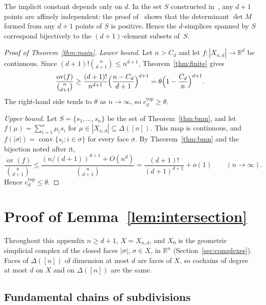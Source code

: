 \documentclass[11pt]{article}
\theoremstyle{definition}
\numberwithin{equation}{section}
\newcommand{\R}{\mathbb R}
\DeclareMathOperator{\ov}{ov}
\DeclareMathOperator{\conv}{conv}
\begin{document}
The implicit constant depends only on $d$. In the set $S$ constructed in~\cite[\S2]{BMN}, any $d+1$ points are affinely independent: the proof of~\cite[Lemma~2.2]{BMN} shows that the determinant $\det M$ formed from any $d+1$ points of $S$ is positive. Hence the $d$-simplices spanned by $S$ correspond bijectively to the $(d+1)$-element subsets of~$S$.

\begin{proof}[Proof of Theorem~\ref{thm:main}]
\emph{Lower bound.} Let $n>C_d$ and let $f:|X_{n,d}|\to\R^d$ be continuous. Since $(d+1)!\binom n{d+1}\le n^{d+1}$, Theorem~\ref{thm:finite} gives
\begin{equation*}
 \frac{\ov(f)}{\binom n{d+1}}\ge\frac{(d+1)!}{n^{d+1}}\Bigl(\frac{n-C_d}{d+1}\Bigr)^{d+1}=\theta\Bigl(1-\frac{C_d}n\Bigr)^{d+1}.
\end{equation*}
The right-hand side tends to $\theta$ as $n\to\infty$, so $c_d^{\mathrm{top}}\ge\theta$.

\emph{Upper bound.} Let $S=\{s_1,\ldots,s_n\}$ be the set of Theorem~\ref{thm:bmn}, and let $f(\mu)=\sum_{i=1}^n\mu_is_i$ for $\mu\in|X_{n,d}|\subseteq\Delta([n])$. This map is continuous, and $f(|\sigma|)=\conv\{s_i:i\in\sigma\}$ for every face $\sigma$. By Theorem~\ref{thm:bmn} and the bijection noted after it,
\begin{equation*}
 \frac{\ov(f)}{\binom n{d+1}}\le\frac{(n/(d+1))^{d+1}+O(n^d)}{\binom n{d+1}}=\frac{(d+1)!}{(d+1)^{d+1}}+o(1)\qquad(n\to\infty).
\end{equation*}
Hence $c_d^{\mathrm{top}}\le\theta$.
\end{proof}

\appendix

\section{Proof of Lemma~\ref{lem:intersection}}\label{app:intersection}

Throughout this appendix $n\ge d+1$, $X=X_{n,d}$, and $X_0$ is the geometric simplicial complex of the closed faces $|\sigma|$, $\sigma\in X$, in $\R^n$ (Section~\ref{sec:complexes}). Faces of $\Delta([n])$ of dimension at most $d$ are faces of $X$, so cochains of degree at most $d$ on $X$ and on $\Delta([n])$ are the same.

\subsection{Fundamental chains of subdivisions}
\end{document}
